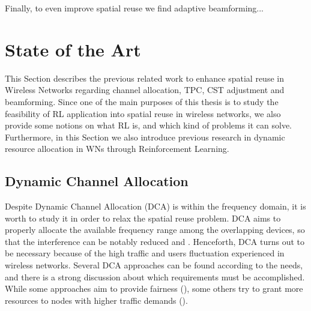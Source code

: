 \documentclass[12pt, a4paper,twoside]{tesi_upf}
\begin{document}
			Finally, to even improve spatial reuse we find adaptive beamforming...			
			
	\chapter{State of the Art}
	\label{section:state_of_the_art}
		This Section describes the previous related work to enhance spatial reuse in Wireless Networks regarding channel allocation, TPC, CST adjustment and beamforming. Since one of the main purposes of this thesis is to study the feasibility of RL application into spatial reuse in wireless networks, we also provide some notions on what RL is, and which kind of problems it can solve. Furthermore, in this Section we also introduce previous research in dynamic resource allocation in WNs through Reinforcement Learning. 
			
		\section{Dynamic Channel Allocation}		
		\label{section:dca}
					
			Despite Dynamic Channel Allocation (DCA) is within the frequency domain, it is worth to study it in order to relax the spatial reuse problem. DCA aims to properly allocate the available frequency range among the overlapping devices, so that the interference can be notably reduced and . Henceforth, DCA turns out to be necessary because of the high traffic and users fluctuation experienced in wireless networks. Several DCA approaches can be found according to the needs, and there is a strong discussion about which requirements must be accomplished. While some approaches aim to provide fairness (\cite{ling2006joint}), some others try to grant more resources to nodes with higher traffic demands (\cite{wertz2004automatic}). 	
		
\end{document}
